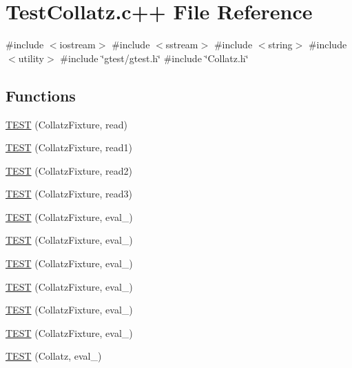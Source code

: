 \hypertarget{_test_collatz_8c_09_09}{\section{\-Test\-Collatz.\-c++ \-File \-Reference}
\label{_test_collatz_8c_09_09}
}
{\ttfamily \#include $<$iostream$>$}\*
{\ttfamily \#include $<$sstream$>$}\*
{\ttfamily \#include $<$string$>$}\*
{\ttfamily \#include $<$utility$>$}\*
{\ttfamily \#include \char`\"{}gtest/gtest.\-h\char`\"{}}\*
{\ttfamily \#include \char`\"{}\-Collatz.\-h\char`\"{}}\*
\subsection*{\-Functions}
\begin{DoxyCompactItemize}
\item 
\hyperlink{_test_collatz_8c_09_09_a528303af22c7c5a550af7342092a9f05}{\-T\-E\-S\-T} (\-Collatz\-Fixture, read)
\item 
\hyperlink{_test_collatz_8c_09_09_a86061488c66d6ec3993858a2fbc36b0f}{\-T\-E\-S\-T} (\-Collatz\-Fixture, read1)
\item 
\hyperlink{_test_collatz_8c_09_09_ab878f3675d378e526be517f391de93fa}{\-T\-E\-S\-T} (\-Collatz\-Fixture, read2)
\item 
\hyperlink{_test_collatz_8c_09_09_ae01e053db02b2e24bc79f2e52531cc59}{\-T\-E\-S\-T} (\-Collatz\-Fixture, read3)
\item 
\hyperlink{_test_collatz_8c_09_09_aa0fcdadaf0d4f7fe0919c37746fe7c74}{\-T\-E\-S\-T} (\-Collatz\-Fixture, eval\-\_)
\item 
\hyperlink{_test_collatz_8c_09_09_a333bb6921f06fa177e9818dbcf3eda06}{\-T\-E\-S\-T} (\-Collatz\-Fixture, eval\-\_)
\item 
\hyperlink{_test_collatz_8c_09_09_a251001c75c1226c607534268ab3a5bcb}{\-T\-E\-S\-T} (\-Collatz\-Fixture, eval\-\_)
\item 
\hyperlink{_test_collatz_8c_09_09_a033aa388470c35adc9579303dba1afa2}{\-T\-E\-S\-T} (\-Collatz\-Fixture, eval\-\_)
\item 
\hyperlink{_test_collatz_8c_09_09_ab529bbfe532bd0b6fbc11c51fe0af7e5}{\-T\-E\-S\-T} (\-Collatz\-Fixture, eval\-\_)
\item 
\hyperlink{_test_collatz_8c_09_09_adebb7237f2a00c256cd0c733885ccd58}{\-T\-E\-S\-T} (\-Collatz\-Fixture, eval\-\_)
\item 
\hyperlink{_test_collatz_8c_09_09_a8702449948723820c9663c19c5a77203}{\-T\-E\-S\-T} (\-Collatz, eval\-\_)

\end{DoxyCompactItemize}
